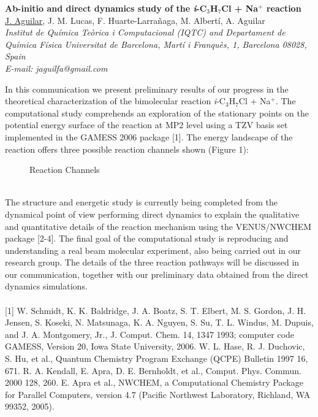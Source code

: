 \setcounter{figure}{0}
\begin{center}
{\bf \Large Ab-initio and direct dynamics study of the \textit{i}-C$_{3}$H$_{7}$Cl + Na$^{+}$ reaction }
\\
\vspace{0.5cm}
\underline{J. Aguilar}, J. M. Lucas, F. Huarte-Larrañaga, M. Albertí, A. Aguilar
\\
\vspace{0.5cm}
{\it
Institut de Química Teòrica i Computacional (IQTC) and
Departament de Química Física
Universitat de Barcelona,
Martí i Franquès, 1, Barcelona 08028, Spain}
\\
\vspace{0.5cm}
{\it E-mail: jaguilfa@gmail.com}
\\
\vspace{0.5cm}
\end{center}
In this communication we present preliminary results of our progress in the
theoretical characterization of the bimolecular reaction \textit{i}-C$_{3}$H$_{7}$Cl + Na$^{+}$. The
computational study comprehends an exploration of the stationary points on the
potential energy surface of the reaction at MP2 level using a TZV basis set
implemented in the GAMESS 2006 package [1]. The energy landscape of the reaction
offers three possible reaction channels shown (Figure 1):
\\
\begin{figure}[h]
 \centerline{}
 \caption[]{Reaction Channels}\label{figure 1}
\end{figure}
\\
The structure and energetic study is currently being completed from the dynamical
point of view performing direct dynamics to explain the qualitative and quantitative
details of the reaction mechanism using the VENUS/NWCHEM package [2-4]. The
final goal of the computational study is reproducing and understanding a real beam
molecular experiment, also being carried out in our research group. The details of the
three reaction pathways will be discussed in our communication, together with our
preliminary data obtained from the direct dynamics simulations.
\\
\vspace{0.5cm}
\\
{\footnotesize
[1] W. Schmidt, K. K. Baldridge, J. A. Boatz, S. T. Elbert, M. S. Gordon, J. H. Jensen, S. Koseki, N.
Matsunaga, K. A. Nguyen, S. Su, T. L. Windus, M. Dupuis, and J. A. Montgomery, Jr., J. Comput.
Chem. 14, 1347 1993; computer code GAMESS, Version 20, Iowa State University, 2006.
\newline
[2] W. L. Hase, R. J. Duchovic, S. Hu, et al., Quantum Chemistry Program Exchange (QCPE) Bulletin
1997 16, 671.
\newline
[3] R. A. Kendall, E. Apra, D. E. Bernholdt, et al., Comput. Phys. Commun. 2000 128, 260.
\newline
[4] E. Apra et al., NWCHEM, a Computational Chemistry Package for Parallel Computers, version
4.7 (Pacific Northwest Laboratory, Richland, WA 99352, 2005).
}

